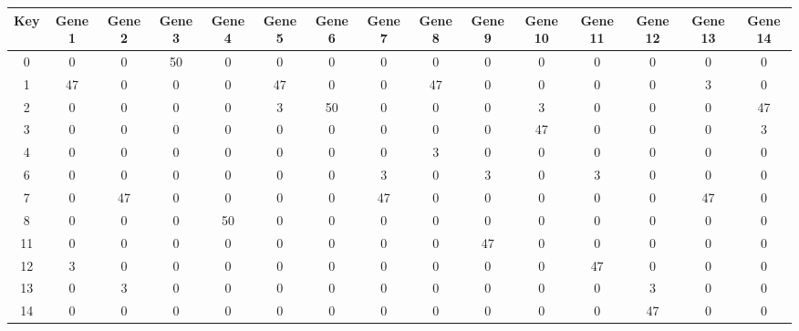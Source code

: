 \begin{tabular}{|c|c|c|c|c|c|c|c|c|c|c|c|c|c|c|}
\hline
Key & Gene 1 & Gene 2 & Gene 3 & Gene 4 & Gene 5 & Gene 6 & Gene 7 & Gene 8 & Gene 9 & Gene 10 & Gene 11 & Gene 12 & Gene 13 & Gene 14 \\
\hline
0 & 0 & 0 & 50 & 0 & 0 & 0 & 0 & 0 & 0 & 0 & 0 & 0 & 0 & 0 \\
1 & 47 & 0 & 0 & 0 & 47 & 0 & 0 & 47 & 0 & 0 & 0 & 0 & 3 & 0 \\
2 & 0 & 0 & 0 & 0 & 3 & 50 & 0 & 0 & 0 & 3 & 0 & 0 & 0 & 47 \\
3 & 0 & 0 & 0 & 0 & 0 & 0 & 0 & 0 & 0 & 47 & 0 & 0 & 0 & 3 \\
4 & 0 & 0 & 0 & 0 & 0 & 0 & 0 & 3 & 0 & 0 & 0 & 0 & 0 & 0 \\
6 & 0 & 0 & 0 & 0 & 0 & 0 & 3 & 0 & 3 & 0 & 3 & 0 & 0 & 0 \\
7 & 0 & 47 & 0 & 0 & 0 & 0 & 47 & 0 & 0 & 0 & 0 & 0 & 47 & 0 \\
8 & 0 & 0 & 0 & 50 & 0 & 0 & 0 & 0 & 0 & 0 & 0 & 0 & 0 & 0 \\
11 & 0 & 0 & 0 & 0 & 0 & 0 & 0 & 0 & 47 & 0 & 0 & 0 & 0 & 0 \\
12 & 3 & 0 & 0 & 0 & 0 & 0 & 0 & 0 & 0 & 0 & 47 & 0 & 0 & 0 \\
13 & 0 & 3 & 0 & 0 & 0 & 0 & 0 & 0 & 0 & 0 & 0 & 3 & 0 & 0 \\
14 & 0 & 0 & 0 & 0 & 0 & 0 & 0 & 0 & 0 & 0 & 0 & 47 & 0 & 0 \\
\hline
\end{tabular}